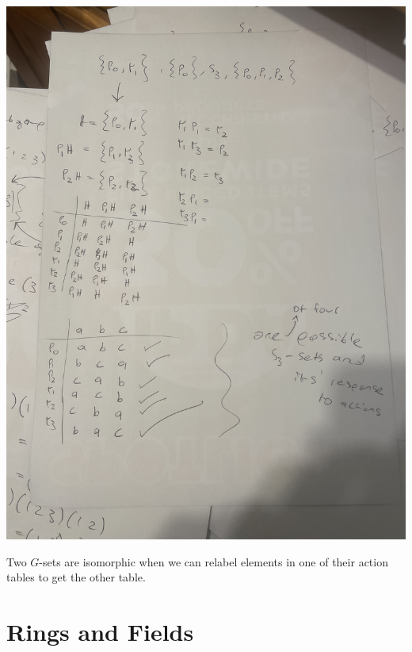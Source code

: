 \begin{center}
\includegraphics[scale=0.3, angle=-90]{fig/IMG_7469.jpeg}
\end{center}
Two $G$-sets are isomorphic when we can relabel elements in one of their action tables to get the other table.
\newpage{}
\section*{Rings and Fields}
